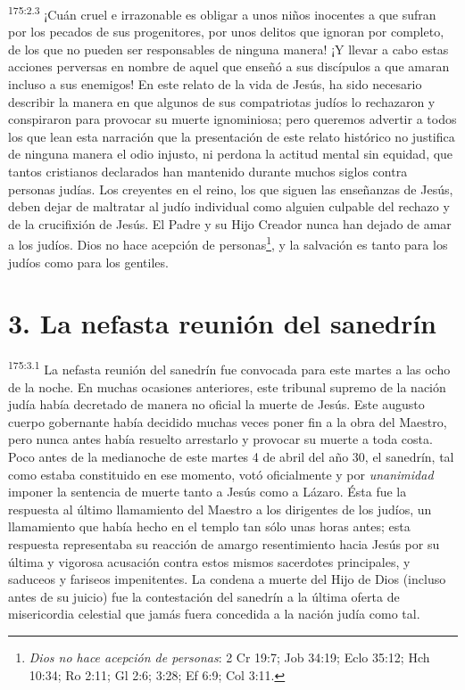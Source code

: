 \par
\textsuperscript{175:2.3} ¡Cuán cruel e irrazonable es obligar a unos niños inocentes a que sufran por los pecados de sus progenitores, por unos delitos que ignoran por completo, de los que no pueden ser responsables de ninguna manera! ¡Y llevar a cabo estas acciones perversas en nombre de aquel que enseñó a sus discípulos a que amaran incluso a sus enemigos! En este relato de la vida de Jesús, ha sido necesario describir la manera en que algunos de sus compatriotas judíos lo rechazaron y conspiraron para provocar su muerte ignominiosa; pero queremos advertir a todos los que lean esta narración que la presentación de este relato histórico no justifica de ninguna manera el odio injusto, ni perdona la actitud mental sin equidad, que tantos cristianos declarados han mantenido durante muchos siglos contra personas judías. Los creyentes en el reino, los que siguen las enseñanzas de Jesús, deben dejar de maltratar al judío individual como alguien culpable del rechazo y de la crucifixión de Jesús. El Padre y su Hijo Creador nunca han dejado de amar a los judíos. Dios no hace acepción de personas\footnote{\textit{Dios no hace acepción de personas}: 2 Cr 19:7; Job 34:19; Eclo 35:12; Hch 10:34; Ro 2:11; Gl 2:6; 3:28; Ef 6:9; Col 3:11.}, y la salvación es tanto para los judíos como para los gentiles.

\section*{3. La nefasta reunión del sanedrín}
\par
\textsuperscript{175:3.1} La nefasta reunión del sanedrín fue convocada para este martes a las ocho de la noche. En muchas ocasiones anteriores, este tribunal supremo de la nación judía había decretado de manera no oficial la muerte de Jesús. Este augusto cuerpo gobernante había decidido muchas veces poner fin a la obra del Maestro, pero nunca antes había resuelto arrestarlo y provocar su muerte a toda costa. Poco antes de la medianoche de este martes 4 de abril del año 30, el sanedrín, tal como estaba constituido en ese momento, votó oficialmente y por \textit{unanimidad} imponer la sentencia de muerte tanto a Jesús como a Lázaro. Ésta fue la respuesta al último llamamiento del Maestro a los dirigentes de los judíos, un llamamiento que había hecho en el templo tan sólo unas horas antes; esta respuesta representaba su reacción de amargo resentimiento hacia Jesús por su última y vigorosa acusación contra estos mismos sacerdotes principales, y saduceos y fariseos impenitentes. La condena a muerte del Hijo de Dios (incluso antes de su juicio) fue la contestación del sanedrín a la última oferta de misericordia celestial que jamás fuera concedida a la nación judía como tal.

